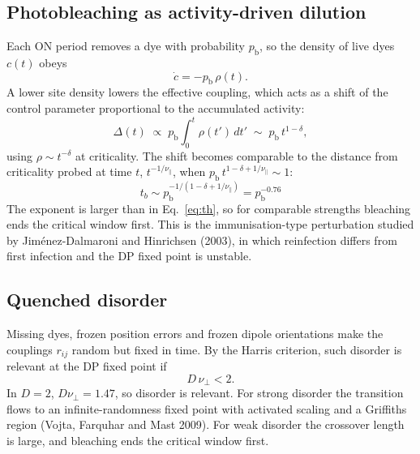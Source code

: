 \documentclass[11pt,a4paper]{article}
\newcommand{\pb}{p_{\mathrm{b}}}
\newcommand{\npar}{\nu_\parallel}
\newcommand{\nperp}{\nu_\perp}
\begin{document}
\subsection{Photobleaching as activity-driven dilution}

Each ON period removes a dye with probability $\pb$, so the density of live dyes
$c(t)$ obeys
\begin{equation}
  \dot c = -\pb\,\rho(t).
\end{equation}
A lower site density lowers the effective coupling, which acts as a shift of the
control parameter proportional to the accumulated activity:
\begin{equation}
  \Delta(t)\;\propto\;\pb\int_0^t\rho(t')\,dt' \;\sim\; \pb\, t^{1-\delta},
\end{equation}
using $\rho\sim t^{-\delta}$ at criticality. The shift becomes comparable to the
distance from criticality probed at time $t$, $t^{-1/\npar}$, when
$\pb\,t^{1-\delta+1/\npar}\sim1$:
\begin{equation}
  \boxed{\;t_b \sim \pb^{-1/(1-\delta+1/\npar)} = \pb^{-0.76}\;}
  \label{eq:tb}
\end{equation}
The exponent is larger than in Eq.~\eqref{eq:th}, so for comparable strengths
bleaching ends the critical window first. This is the immunisation-type
perturbation studied by Jim\'enez-Dalmaroni and Hinrichsen (2003), in which
reinfection differs from first infection and the DP fixed point is unstable.

\subsection{Quenched disorder}\label{sec:disorder}

Missing dyes, frozen position errors and frozen dipole orientations make the
couplings $r_{ij}$ random but fixed in time. By the Harris criterion, such
disorder is relevant at the DP fixed point if
\begin{equation}
  D\,\nperp < 2 .
\end{equation}
In $D=2$, $D\nperp=1.47$, so disorder is relevant. For strong disorder the
transition flows to an infinite-randomness fixed point with activated scaling
and a Griffiths region (Vojta, Farquhar and Mast 2009). For weak disorder the
crossover length is large, and bleaching ends the critical window first.
\end{document}
